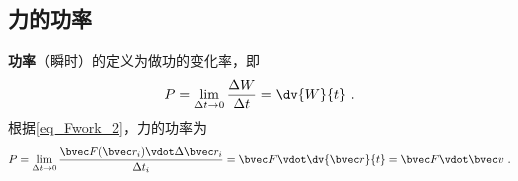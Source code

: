 \subsection{力的功率}
\textbf{功率}（瞬时）的定义为做功的变化率，即
\begin{equation}
P = \lim_{\Delta t\to 0} \frac{\Delta W}{\Delta t} = \dv{W}{t}~.
\end{equation}
根据\autoref{eq_Fwork_2}，力的功率为
\begin{equation}
P = \lim_{\Delta t\to 0} \frac{\bvec F(\bvec r_i)\vdot\Delta\bvec r_i}{\Delta t_i} = \bvec F \vdot\dv{\bvec r}{t} = \bvec F\vdot\bvec v~.
\end{equation}






